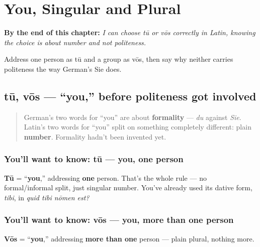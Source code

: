 
\chapter{You, Singular and Plural}
\label{ch:la-you-singular-plural}

\begin{chapteropening}
\textbf{By the end of this chapter:} \emph{I can choose tū or vōs correctly in Latin, knowing the choice is about number and not politeness.}

Address one person as tū and a group as vōs, then say why neither carries politeness the way German's Sie does.
\end{chapteropening}

\section[tū / vōs]{tū, vōs — \textquotedblleft{}you,\textquotedblright{} before politeness got involved}

\label{lesson:LA-C22-tu-vos}



\begin{quote}
German's two words for \textquotedblleft{}you\textquotedblright{} are about \textbf{formality} — \emph{du} against \emph{Sie}. Latin's two words for \textquotedblleft{}you\textquotedblright{} split on something completely different: plain \textbf{number}. Formality hadn't been invented yet.
\end{quote}

\subsection*{You'll want to know: tū — you, one person}
\textbf{Tū} = \textquotedblleft{}\textbf{you},\textquotedblright{} addressing \textbf{one} person. That's the whole rule — no formal/informal split, just singular number. You've already used its dative form, \emph{tibi}, in \emph{quid tibi nōmen est?}

\subsection*{You'll want to know: vōs — you, more than one person}
\textbf{Vōs} = \textquotedblleft{}\textbf{you},\textquotedblright{} addressing \textbf{more than one} person — plain plural, nothing more.

